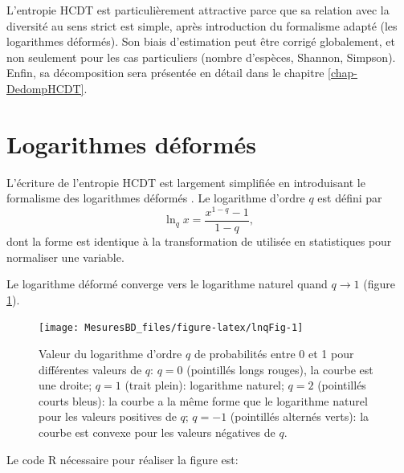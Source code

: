 \documentclass[
  11pt,
  american,
  a4paper,
  extrafontsizes,onecolumn,openright
  ]{memoir}
\begin{document}
L'entropie HCDT est particulièrement attractive parce que sa relation avec la diversité au sens strict est simple, après introduction du formalisme adapté (les logarithmes déformés).
Son biais d'estimation peut être corrigé globalement, et non seulement pour les cas particuliers (nombre d'espèces, Shannon, Simpson).
Enfin, sa décomposition sera présentée en détail dans le chapitre \ref{chap-DedompHCDT}.

\section{Logarithmes déformés}\label{logarithmes-duxe9formuxe9s}

L'écriture de l'entropie HCDT est largement simplifiée en introduisant le formalisme des logarithmes déformés \autocite{Tsallis1994}.
Le logarithme d'ordre \(q\) est défini par
\begin{equation}
  \label{eq:lnq}
  \ln_q{x} = \frac{x^{1-q} - 1}{1 - q},
\end{equation}
dont la forme est identique à la transformation de \textcite{Box1964} utilisée en statistiques pour normaliser une variable.

Le logarithme déformé converge vers le logarithme naturel quand \(q \to 1\) (figure \ref{fig:lnqFig}).



\scriptsize

\begin{figure}

{\centering \texttt{[image: MesuresBD\_files/figure-latex/lnqFig-1]} 

}

\caption{Valeur du logarithme d'ordre \(q\) de probabilités entre 0 et 1 pour différentes valeurs de \(q\): \(q = 0\) (pointillés longs rouges), la courbe est une droite; \(q = 1\) (trait plein): logarithme naturel; \(q = 2\) (pointillés courts bleus): la courbe a la même forme que le logarithme naturel pour les valeurs positives de \(q\); \(q = -1\) (pointillés alternés verts): la courbe est convexe pour les valeurs négatives de \(q\).}\label{fig:lnqFig}
\end{figure}

\normalsize

Le code R nécessaire pour réaliser la figure est:

\scriptsize
\end{document}
